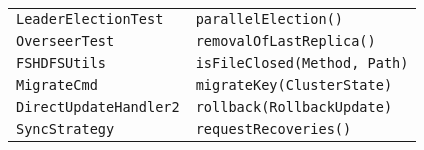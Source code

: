 \begin{center}
\begin{longtable}{ll}
\lstinline/LeaderElectionTest/&{\lstinline/parallelElection()/}\\
\lstinline/OverseerTest/&{\lstinline/removalOfLastReplica()/}\\
\lstinline/FSHDFSUtils/&{\lstinline/isFileClosed(Method, Path)/}\\
\lstinline/MigrateCmd/&{\lstinline/migrateKey(ClusterState)/}\\
\lstinline/DirectUpdateHandler2/&{\lstinline/rollback(RollbackUpdate)/}\\
\lstinline/SyncStrategy/&{\lstinline/requestRecoveries()/}\\
\end{longtable}
\end{center}
